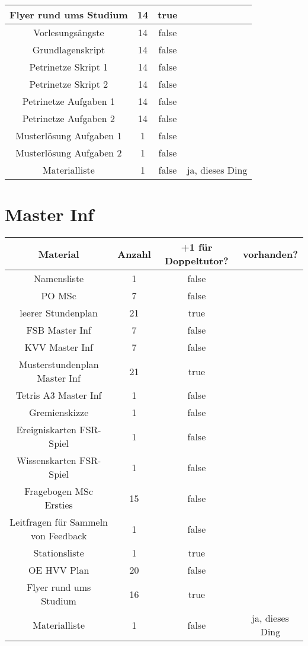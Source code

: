 \documentclass[10pt,a4paper,oneside,ngerman,numbers=noenddot]{scrartcl}
\begin{document}
\begin{tabular}{c|c|c|c}
		\hline
		Flyer rund ums Studium & 14 & true & \\
		\hline
		Vorlesungsängste & 14 & false & \\
		\hline
		Grundlagenskript & 14 & false & \\
		\hline
		Petrinetze Skript 1 & 14 & false & \\
		\hline
		Petrinetze Skript 2 & 14 & false & \\
		\hline
		Petrinetze Aufgaben 1 & 14 & false & \\
		\hline
		Petrinetze Aufgaben 2 & 14 & false & \\
		\hline
		Musterlösung Aufgaben 1 & 1 & false & \\
		\hline
		Musterlösung Aufgaben 2 & 1 & false & \\
		\hline
		Materialliste & 1 & false & ja, dieses Ding \\
	\end{tabular}

\section{Master Inf}

	\begin{tabular}{c|c|c|c}
		\textbf{Material} & \textbf{Anzahl} & \textbf{+1 für Doppeltutor?} & \textbf{vorhanden?} \\
		\hline
		Namensliste & 1 & false & \\
		\hline
		PO MSc & 7 & false & \\
		\hline
		leerer Stundenplan & 21 & true & \\
		\hline
		FSB Master Inf & 7 & false & \\
		\hline
		KVV Master Inf & 7 & false & \\
		\hline
		Musterstundenplan Master Inf & 21 & true & \\
		\hline
		Tetris A3 Master Inf & 1 & false & \\
		\hline
		Gremienskizze & 1 & false & \\
		\hline
		Ereigniskarten FSR-Spiel & 1 & false & \\
		\hline
		Wissenskarten FSR-Spiel & 1 & false & \\
		\hline
		Fragebogen MSc Ersties & 15 & false & \\
		\hline
		Leitfragen für Sammeln von Feedback & 1 & false & \\
		\hline
		Stationsliste & 1 & true & \\
		\hline
		OE HVV Plan & 20 & false & \\
		\hline
		Flyer rund ums Studium & 16 & true & \\
		\hline
		Materialliste & 1 & false & ja, dieses Ding \\
	\end{tabular}
\end{document}
